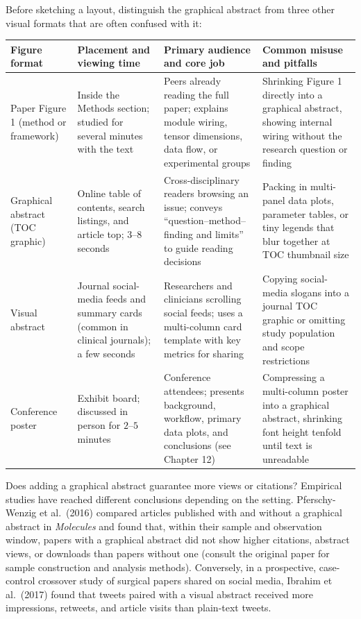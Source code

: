 Before sketching a layout, distinguish the graphical abstract from three other visual formats that are often confused with it:

\begin{center}\footnotesize
\setlength{\tabcolsep}{3pt}
\renewcommand{\arraystretch}{1.15}
\begin{tabularx}{\linewidth}{@{}>{\raggedright\arraybackslash}p{23mm}>{\raggedright\arraybackslash}p{25mm}YY@{}}
\toprule
\textbf{Figure format} & \textbf{Placement and viewing time} & \textbf{Primary audience and core job} & \textbf{Common misuse and pitfalls} \\
\midrule
Paper Figure 1 (method or framework) & Inside the Methods section; studied for several minutes with the text & Peers already reading the full paper; explains module wiring, tensor dimensions, data flow, or experimental groups & Shrinking Figure 1 directly into a graphical abstract, showing internal wiring without the research question or finding \\
Graphical abstract (TOC graphic) & Online table of contents, search listings, and article top; $3\text{--}8$ seconds & Cross-disciplinary readers browsing an issue; conveys ``question--method--finding and limits'' to guide reading decisions & Packing in multi-panel data plots, parameter tables, or tiny legends that blur together at TOC thumbnail size \\
Visual abstract & Journal social-media feeds and summary cards (common in clinical journals); a few seconds & Researchers and clinicians scrolling social feeds; uses a multi-column card template with key metrics for sharing & Copying social-media slogans into a journal TOC graphic or omitting study population and scope restrictions \\
Conference poster & Exhibit board; discussed in person for $2\text{--}5$ minutes & Conference attendees; presents background, workflow, primary data plots, and conclusions (see Chapter 12) & Compressing a multi-column poster into a graphical abstract, shrinking font height tenfold until text is unreadable \\
\bottomrule
\end{tabularx}
\end{center}

Does adding a graphical abstract guarantee more views or citations? Empirical studies have reached different conclusions depending on the setting. Pferschy-Wenzig et al.\ (2016) compared articles published with and without a graphical abstract in \textit{Molecules} and found that, within their sample and observation window, papers with a graphical abstract did not show higher citations, abstract views, or downloads than papers without one (consult the original paper for sample construction and analysis methods). Conversely, in a prospective, case-control crossover study of surgical papers shared on social media, Ibrahim et al.\ (2017) found that tweets paired with a visual abstract received more impressions, retweets, and article visits than plain-text tweets.

